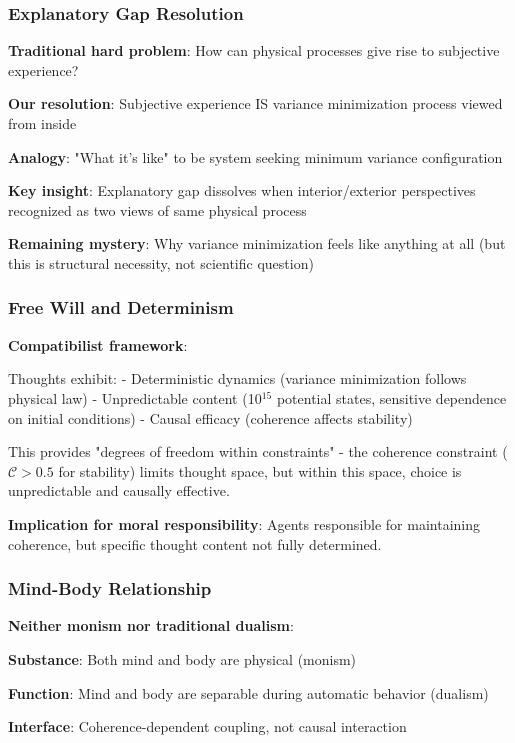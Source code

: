\documentclass[11pt,onecolumn]{article}
\begin{document}
\subsubsection{Explanatory Gap Resolution}

\textbf{Traditional hard problem}: How can physical processes give rise to subjective experience?

\textbf{Our resolution}: Subjective experience IS variance minimization process viewed from inside

\textbf{Analogy}: "What it's like" to be system seeking minimum variance configuration

\textbf{Key insight}: Explanatory gap dissolves when interior/exterior perspectives recognized as two views of same physical process

\textbf{Remaining mystery}: Why variance minimization feels like anything at all (but this is structural necessity, not scientific question)

\subsubsection{Free Will and Determinism}

\textbf{Compatibilist framework}: 

Thoughts exhibit:
- Deterministic dynamics (variance minimization follows physical law)
- Unpredictable content (10$^{15}$ potential states, sensitive dependence on initial conditions)
- Causal efficacy (coherence affects stability)

This provides "degrees of freedom within constraints" - the coherence constraint ($\mathcal{C} > 0.5$ for stability) limits thought space, but within this space, choice is unpredictable and causally effective.

\textbf{Implication for moral responsibility}: Agents responsible for maintaining coherence, but specific thought content not fully determined.

\subsubsection{Mind-Body Relationship}

\textbf{Neither monism nor traditional dualism}:

\textbf{Substance}: Both mind and body are physical (monism)

\textbf{Function}: Mind and body are separable during automatic behavior (dualism)

\textbf{Interface}: Coherence-dependent coupling, not causal interaction
\end{document}
